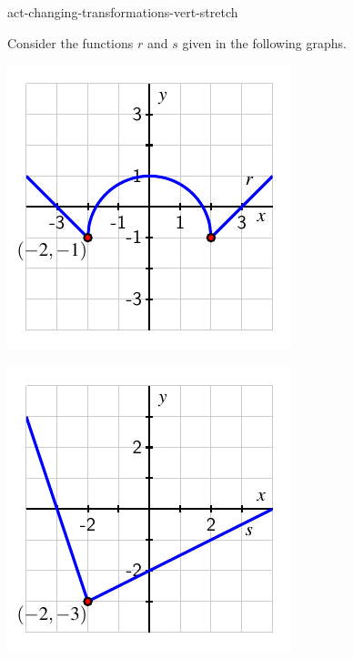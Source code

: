 \documentclass{ximera}
\begin{document}
\begin{exploration}{}{act-changing-transformations-vert-stretch}%


Consider the functions \(r\) and \(s\) given in the following graphs.%

\begin{image}
\includegraphics[width=1\linewidth]{images/transformations-act-r-translation}

\includegraphics[width=1\linewidth]{images/transformations-act-s-translation}
\end{image}


\end{exploration}
\end{document}
